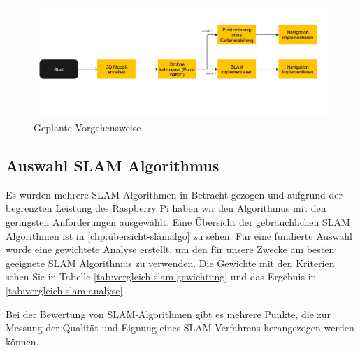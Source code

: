 \begin{figure}
    \includegraphics[scale=0.7]{images/ansatz_plan.pdf}
    \caption{Geplante Vorgehensweise}\label{fig:vorgehensweise}
\end{figure}

\subsection{Auswahl SLAM Algorithmus}

Es wurden mehrere \ac{SLAM}-Algorithmen in Betracht gezogen und aufgrund der begrenzten Leistung des Raspberry Pi haben wir den Algorithmus mit den geringsten Anforderungen ausgewählt. Eine Übersicht der gebräuchlichen \ac{SLAM} Algorithmen ist in \ref{chp:übersicht-slamalgo} zu sehen. Für eine fundierte Auswahl wurde eine gewichtete Analyse erstellt, um den für unsere Zwecke am besten geeignete \ac{SLAM} Algorithmus zu verwenden. Die Gewichte mit den Kriterien sehen Sie in Tabelle \ref{tab:vergleich-slam-gewichtung} und das Ergebnis in \ref{tab:vergleich-slam-analyse}.

Bei der Bewertung von \ac{SLAM}-Algorithmen gibt es mehrere Punkte, die zur Messung der Qualität und Eignung eines SLAM-Verfahrens herangezogen werden können.

